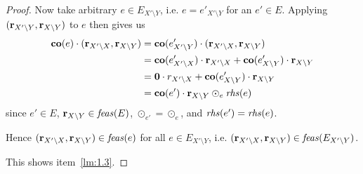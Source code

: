 \begin{proof}
Now take arbitrary $e\in E_{X'\setminus Y}$, i.e. $e = e'_{X'\setminus Y}$ for an $e'\in E$. Applying    
$(\mathbf{r}_{X'\setminus Y}, \mathbf{r}_{X\setminus Y})$ to $e$ then gives us
\begin{align*}
\mathbf{co}(e)\cdot(\mathbf{r}_{X'\setminus X}, \mathbf{r}_{X\setminus Y})
&=\mathbf{co}(e'_{X'\setminus Y})\cdot(\mathbf{r}_{X'\setminus X}, \mathbf{r}_{X\setminus Y})\\
&= \mathbf{co}(e'_{X'\setminus X})\cdot\mathbf{r}_{X'\setminus X} + \mathbf{co}(e'_{X\setminus Y})\cdot \mathbf{r}_{X\setminus Y}\\
& = \mathbf{0}\cdot r_{X'\setminus X} + \mathbf{co}(e'_{X\setminus Y})\cdot\mathbf{r}_{X\setminus Y}\\
& = \mathbf{co}(e')\cdot\mathbf{r}_{X\setminus Y} \odot_{e} \mathit{rhs}(e)
\end{align*}
since $e'\in E$, $\mathbf{r}_{X\setminus Y}\in\mathit{feas}(E)$, $\odot_{e'}=\odot_{e}$, and $\mathit{rhs}(e')=\mathit{rhs}(e)$.

Hence $(\mathbf{r}_{X'\setminus X}, \mathbf{r}_{X\setminus Y})\in \mathit{feas}(e)$ for all $e\in E_{X'\setminus Y}$, i.e. $(\mathbf{r}_{X'\setminus X}, \mathbf{r}_{X\setminus Y})\in \mathit{feas}(E_{X'\setminus Y})$.

This shows item~\ref{lm:1.3}.
\end{proof}

